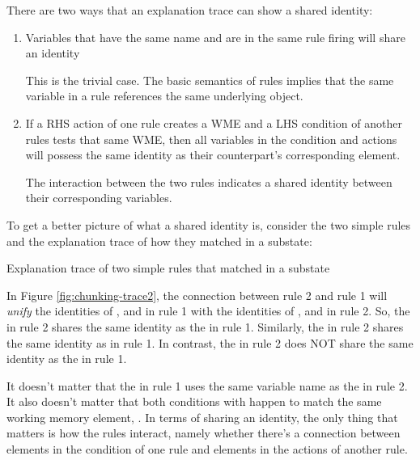 There are two ways that an explanation trace can show a shared identity:

\begin{enumerate}
	\item Variables that have the same name and are in the same rule firing will share an identity

	This is the trivial case.  The basic semantics of rules implies that the same variable in a rule references the same underlying object.

	\vspace{-6pt}
	\item If a RHS action of one rule creates a WME and a LHS condition of another rules tests that same WME, then all variables in the condition and actions will possess the same identity as their counterpart's corresponding element. 

	The interaction between the two rules indicates a shared identity between their corresponding variables.
	\vspace{-6pt}
\end{enumerate}

To get a better picture of what a shared identity is, consider the two simple rules and the explanation trace of how they matched in a substate: 

\vspace{12pt}
\begin{center}
	\captionsetup{type=figure}
	\centering{}
	\caption{Explanation trace of two simple rules that matched in a substate}
	\label{fig:chunking-trace2}
\end{center}

In Figure \ref{fig:chunking-trace2}, the connection between rule 2 and rule 1 will \textit{unify} the identities of ,  and  in rule 1 with the identities of ,  and  in rule 2.  So, the  in rule 2 shares the same identity as the  in rule 1.  Similarly, the  in rule 2 shares the same identity as  in rule 1.  In contrast, the  in rule 2 does NOT share the same identity as the  in rule 1. 

It doesn't matter that the  in rule 1 uses the same variable name as the  in rule 2.  It also doesn't matter that both conditions with  happen to match the same working memory element, .  In terms of sharing an identity, the only thing that matters is how the rules interact, namely whether there's a connection between elements in the condition of one rule and elements in the actions of another rule.

